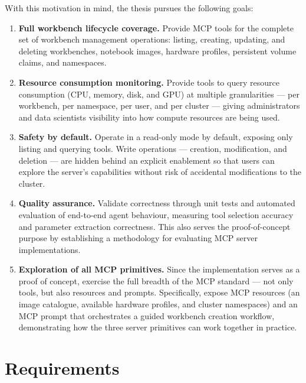 \documentclass[
  digital,     %
  oneside,     %
  nosansbold,  %
  nocolorbold, %
  lof,         %
  lot,         %
]{fithesis4}
\begin{document}
With this motivation in mind, the thesis pursues the following goals:

\begin{enumerate}
  \item \textbf{Full workbench lifecycle coverage.} Provide MCP tools for
        the complete set of workbench management operations: listing,
        creating, updating, and deleting workbenches, notebook images,
        hardware profiles, persistent volume claims, and namespaces.

  \item \textbf{Resource consumption monitoring.} Provide tools to query
        resource consumption (CPU, memory, disk, and GPU) at multiple
        granularities --- per workbench, per namespace, per user, and per
        cluster --- giving administrators and data scientists visibility
        into how compute resources are being used.

  \item \textbf{Safety by default.} Operate in a read-only mode by default,
        exposing only listing and querying tools. Write operations ---
        creation, modification, and deletion --- are hidden behind an explicit
        enablement so that users can explore the server's capabilities
        without risk of accidental modifications to the cluster.

  \item \textbf{Quality assurance.} Validate correctness through unit tests
        and automated evaluation of end-to-end agent behaviour, measuring
        tool selection accuracy and parameter extraction correctness. This
        also serves the proof-of-concept purpose by establishing a methodology
        for evaluating MCP server implementations.

  \item \textbf{Exploration of all MCP primitives.} Since the
        implementation serves as a proof of concept, exercise the full
        breadth of the MCP standard --- not only tools, but also resources
        and prompts. Specifically, expose MCP resources (an image catalogue,
        available hardware profiles, and cluster namespaces) and an MCP prompt
        that orchestrates a guided workbench creation workflow, demonstrating
        how the three server primitives can work together in practice.
\end{enumerate}

\section{Requirements}
\label{sec:requirements}
\end{document}
